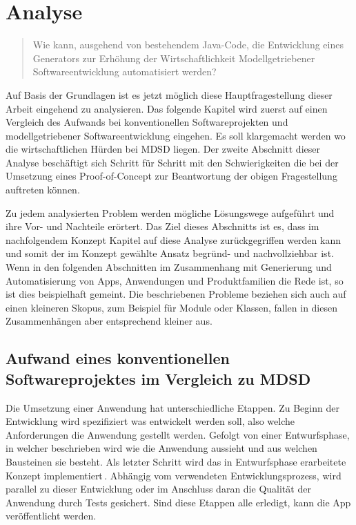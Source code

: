 \documentclass[12pt,oneside,a4paper,parskip]{scrbook}
\begin{document}
\chapter{Analyse}

\begin{quote}\glqq Wie kann, ausgehend von bestehendem Java-Code, die Entwicklung eines Generators zur Erhöhung der Wirtschaftlichkeit Modellgetriebener Softwareentwicklung automatisiert werden?\grqq \end{quote}

Auf Basis der Grundlagen ist es jetzt möglich diese Hauptfragestellung dieser Arbeit eingehend zu analysieren. Das folgende Kapitel wird zuerst auf einen Vergleich des Aufwands bei konventionellen Softwareprojekten und modellgetriebener Softwareentwicklung eingehen. Es soll klargemacht werden wo die wirtschaftlichen Hürden bei MDSD liegen. Der zweite Abschnitt dieser Analyse beschäftigt sich Schritt für Schritt mit den Schwierigkeiten die bei der Umsetzung eines Proof-of-Concept zur Beantwortung der obigen Fragestellung auftreten können.

Zu jedem analysierten Problem werden mögliche Lösungswege aufgeführt und ihre Vor- und Nachteile erörtert. Das Ziel dieses Abschnitts ist es, dass im nachfolgendem Konzept Kapitel auf diese Analyse zurückgegriffen werden kann und somit der im Konzept gewählte Ansatz begründ- und nachvollziehbar ist. Wenn in den folgenden Abschnitten im Zusammenhang mit Generierung und Automatisierung von Apps, Anwendungen und Produktfamilien die Rede ist, so ist dies beispielhaft gemeint. Die beschriebenen Probleme beziehen sich auch auf einen kleineren Skopus, zum Beispiel für Module oder Klassen, fallen in diesen Zusammenhängen aber entsprechend kleiner aus.

\section{Aufwand eines konventionellen Softwareprojektes im Vergleich zu MDSD}

Die Umsetzung einer Anwendung hat unterschiedliche Etappen. Zu Beginn der Entwicklung wird spezifiziert was entwickelt werden soll, also welche Anforderungen die Anwendung gestellt werden. Gefolgt von einer Entwurfsphase, in welcher beschrieben wird wie die Anwendung aussieht und aus welchen Bausteinen sie besteht. Als letzter Schritt wird das in Entwurfsphase erarbeitete Konzept implementiert\,\cite[S. 62]{balzert2009a}. Abhängig vom verwendeten Entwicklungsprozess, wird parallel zu dieser Entwicklung oder im Anschluss daran die Qualität der Anwendung durch Tests gesichert. Sind diese Etappen alle erledigt, kann die App veröffentlicht werden.
\end{document}

